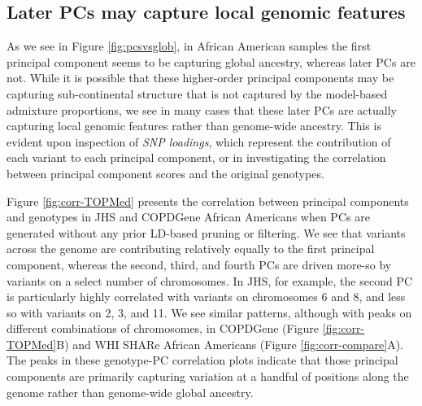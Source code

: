 \documentclass[12pt]{article}
\begin{document}
\subsection{Later PCs may capture local genomic features}
\label{sec:CorrPlots}

%
%


As we see in Figure \ref{fig:pcsvsglob}, in African American samples the first principal component seems to be capturing global ancestry, whereas later PCs are not.
While it is possible that these higher-order principal components may be capturing sub-continental structure that is not captured by the model-based admixture proportions, we see in many cases that these later PCs are actually capturing local genomic features rather than genome-wide ancestry. 
This is evident upon inspection of \textit{SNP loadings}, which represent the contribution of each variant to each principal component, or in investigating the correlation between principal component scores and the original genotypes.

Figure \ref{fig:corr-TOPMed} presents the correlation between principal components and genotypes in JHS and COPDGene African Americans when PCs are generated without any prior LD-based pruning or filtering.
We see that variants across the genome are contributing relatively equally to the first principal component, whereas the second, third, and fourth PCs are driven more-so by variants on a select number of chromosomes.
In JHS, for example, the second PC is particularly highly correlated with variants on chromosomes 6 and 8, and less so with variants on 2, 3, and 11.
We see similar patterns, although with peaks on different combinations of chromosomes, in COPDGene (Figure \ref{fig:corr-TOPMed}B) and WHI SHARe African Americans (Figure \ref{fig:corr-compare}A).
The peaks in these genotype-PC correlation plots indicate that those principal components are primarily capturing variation at a handful of positions along the genome rather than genome-wide global ancestry.
\end{document}
